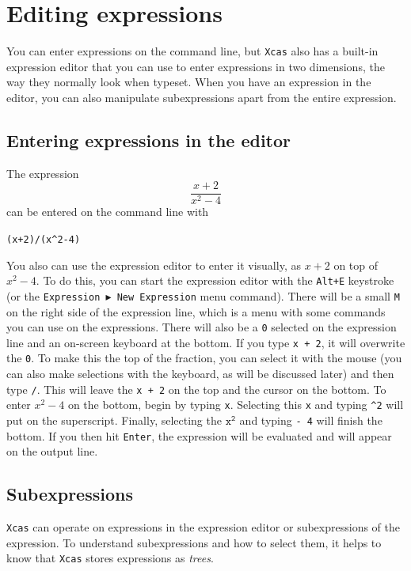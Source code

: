 \documentclass[a4paper,11pt]{book}
\begin{document}
\section{Editing expressions}

You can enter expressions on the command line, but \texttt{Xcas} also
has a built-in expression editor that you can use to enter expressions
in two dimensions, the way they normally look when typeset.  When you
have an expression in the editor, you can also manipulate
subexpressions apart from the entire expression.

\subsection{Entering expressions in the editor}

The expression
\[\frac{x+2}{x^2-4}\]
can be entered on the command line with
\begin{center}
{\tt (x+2)/(x\^{}2-4)}
\end{center}
You also can use the expression editor to
enter it visually, as $x+2$ on top of $x^2 - 4$.  To do this, you can
start the expression editor with the \texttt{Alt+E} keystroke (or the
\texttt{Expression $\blacktriangleright$ New Expression} menu
command).  There will be a small \texttt{M} on the right side of the
expression line, which is a menu with some commands you can use on the
expressions.  There will also be a \texttt{0} selected on the
expression line and an on-screen keyboard at the bottom.  If you type
\texttt{x + 2}, it will overwrite the \texttt{0}.  To make this the
top of the fraction, you can select it with the mouse (you can also
make selections with the keyboard, as will be discussed later) and
then type \texttt{/}.  This will leave the \texttt{x + 2} on the top
and the cursor on the bottom.  To enter $x^2 - 4$ on the bottom, begin
by typing \texttt{x}.  Selecting this \texttt{x} and typing
\texttt{\^{}2} will put on the superscript.  Finally, selecting the
$\texttt{x}^{\texttt{2}}$ and typing \texttt{- 4} will finish the
bottom.  If you then hit \texttt{Enter}, the expression will be
evaluated and will appear on the output line.

\subsection{Subexpressions}

\texttt{Xcas} can operate on expressions in the expression editor or
subexpressions of the expression.  To understand subexpressions and
how to select them, it helps to know that \texttt{Xcas} stores
expressions as \textsl{trees}.
\end{document}
